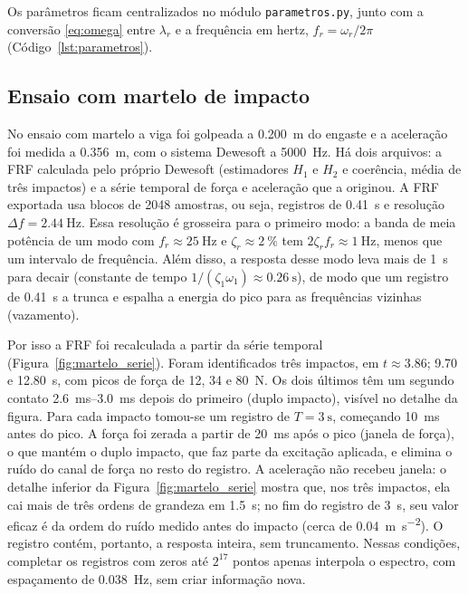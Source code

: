Os parâmetros ficam centralizados no módulo \texttt{parametros.py}, junto com a
conversão \eqref{eq:omega} entre $\lambda_r$ e a frequência em hertz,
$f_r = \omega_r/2\pi$ (Código~\ref{lst:parametros}).


\subsection{Ensaio com martelo de impacto}
\label{sec:met_martelo}

No ensaio com martelo a viga foi golpeada a \SI{0.200}{\meter} do engaste e a
aceleração foi medida a \SI{0.356}{\meter}, com o sistema Dewesoft a
\SI{5000}{\hertz}. Há dois arquivos: a FRF calculada pelo próprio Dewesoft
(estimadores $H_1$ e $H_2$ e coerência, média de três impactos) e a série temporal de
força e aceleração que a originou. A FRF exportada usa blocos de 2048 amostras, ou
seja, registros de \SI{0.41}{\second} e resolução $\Delta f = \SI{2.44}{\hertz}$. Essa
resolução é grosseira para o primeiro modo: a banda de meia potência de um modo com
$f_r \approx \SI{25}{\hertz}$ e $\zeta_r \approx \SI{2}{\percent}$ tem
$2\zeta_r f_r \approx \SI{1}{\hertz}$, menos que um intervalo de frequência. Além
disso, a resposta desse modo leva mais de \SI{1}{\second} para decair (constante de
tempo $1/(\zeta_1\omega_1) \approx \SI{0.26}{\second}$), de modo que um registro de
\SI{0.41}{\second} a trunca e espalha a energia do pico para as frequências vizinhas
(vazamento).

Por isso a FRF foi recalculada a partir da série temporal
(Figura~\ref{fig:martelo_serie}). Foram identificados três impactos, em
$t \approx \num{3.86}$; \num{9.70} e \SI{12.80}{\second}, com picos de força de
\num{12}, \num{34} e \SI{80}{\newton}. Os dois últimos têm um segundo contato
\SIrange{2.6}{3.0}{\milli\second} depois do primeiro (duplo impacto), visível no
detalhe da figura.
Para cada impacto tomou-se um registro de $T = \SI{3}{\second}$, começando
\SI{10}{\milli\second} antes do pico. A força foi zerada a partir de
\SI{20}{\milli\second} após o pico (janela de força), o que mantém o duplo impacto, que faz
parte da excitação aplicada, e elimina o ruído do canal de força no resto do registro.
A aceleração não recebeu janela: o detalhe inferior da Figura~\ref{fig:martelo_serie}
mostra que, nos três impactos, ela cai mais de três ordens de grandeza em
\SI{1.5}{\second}; no fim do registro de \SI{3}{\second}, seu valor eficaz é da ordem
do ruído medido antes do impacto (cerca de \SI{0.04}{\meter\per\second\squared}).
O registro contém, portanto, a resposta inteira, sem truncamento. Nessas condições, completar os registros com zeros até
$2^{17}$ pontos apenas interpola o espectro, com espaçamento de
\SI{0.038}{\hertz}, sem criar informação nova.

